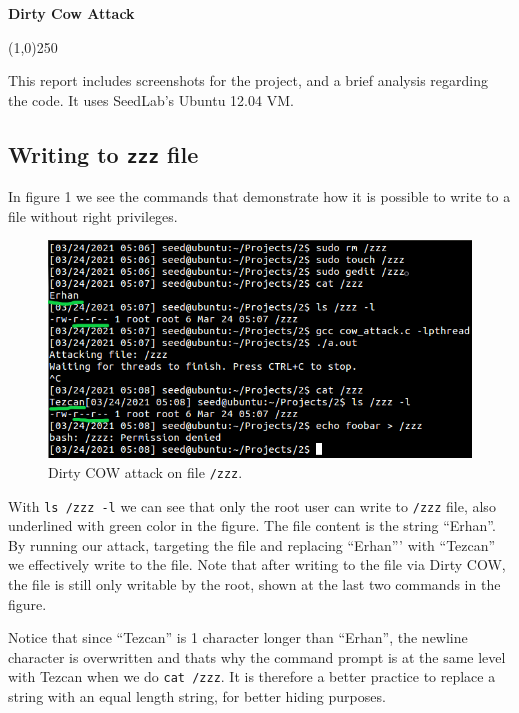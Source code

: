 \documentclass[12pt,reqno]{amsart}
\newcommand{\code}[1]{\texttt{#1}}
\begin{document}
\begin{center}
  \large\textbf{Dirty Cow Attack} \\
\end{center}

\begin{center}
  \line(1,0){250}
\end{center}

This report includes screenshots for the project, and a brief analysis regarding the code. It uses SeedLab's Ubuntu 12.04 VM.

\subsection{Writing to \code{zzz} file}
In figure 1 we see the commands that demonstrate how it is possible to write to a file without right privileges. 

\begin{figure}[h]
  \label{fig:zzz}
  \includegraphics[width=\linewidth]{img/part2.png}
  \caption{Dirty COW attack on file \code{/zzz}.}
\end{figure}

With \code{ls /zzz -l} we can see that only the root user can write to \code{/zzz} file, also underlined with green color in the figure. The file content is the string ``Erhan''. By running our attack, targeting the file and replacing ``Erhan''' with ``Tezcan'' we effectively write to the file. Note that after writing to the file via Dirty COW, the file is still only writable by the root, shown at the last two commands in the figure.

Notice that since ``Tezcan'' is 1 character longer than ``Erhan'', the newline character is overwritten and thats why the command prompt is at the same level with Tezcan when we do \code{cat /zzz}. It is therefore a better practice to replace a string with an equal length string, for better hiding purposes.
\end{document}
